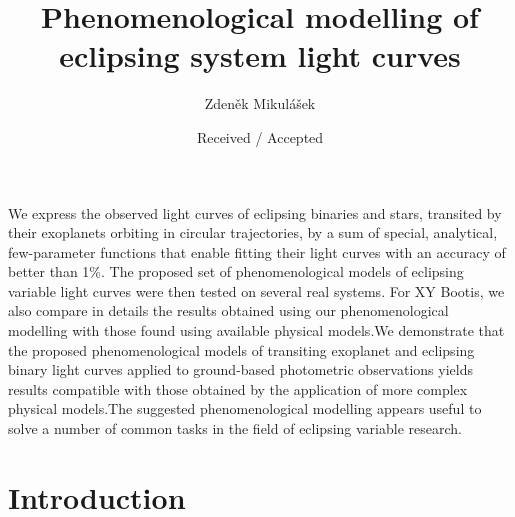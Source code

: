 \documentclass{aa}
\begin{document}
\title{Phenomenological modelling of eclipsing system light curves}

\author{Zden\v{e}k Mikul\'a\v sek}


\date{Received / Accepted }

{We express the observed light curves of eclipsing binaries and stars, transited by their exoplanets orbiting in circular trajectories, by a sum of special, analytical, few-parameter functions that enable fitting their light curves with an accuracy of better than 1\%. The proposed set of phenomenological models of eclipsing variable light curves were then tested on several real systems. For XY Bootis, we also compare in details the results obtained using our phenomenological modelling  with those found using available physical models.}{We demonstrate that the proposed phenomenological models of transiting exoplanet and eclipsing binary light curves applied to ground-based photometric observations yields results compatible with those obtained by the application of more complex physical models.}{The suggested phenomenological modelling appears useful to solve a number of common tasks in the field of eclipsing variable research.}



\maketitle

\section{Introduction}
\end{document}
